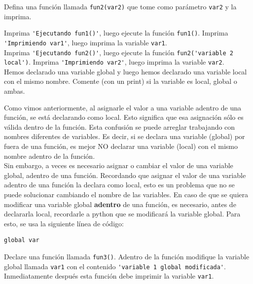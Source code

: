 \documentclass[11pt,letterpaper]{exam}
\begin{document}
\begin{questions}
Defina una funci\'on llamada \verb"fun2(var2)" que tome como par\'ametro \verb"var2" y la imprima.



Imprima \verb"'Ejecutando fun1()'", luego ejecute la funci\'on \verb"fun1()". Imprima \verb"'Imprimiendo var1'", luego imprima la variable \verb"var1". \\

Imprima \verb"'Ejecutando fun2()'", luego ejecute la funci\'on \verb"fun2('variable 2 local')". Imprima \verb"'Imprimiendo var2'", luego imprima la variable \verb"var2". \\

Hemos declarado una variable global y luego hemos declarado una variable local con el mismo nombre. Comente (con un print) si la variable es local, global o ambas.


Como vimos anteriormente, al asignarle el valor a una variable adentro de una funci\'on, se est\'a declarando como local. Esto significa que esa asignaci\'on s\'olo es v\'alida dentro de la funci\'on. Esta confusi\'on se puede arreglar trabajando con nombres diferentes de variables. Es decir, si se declara una variable (global) por fuera de una funci\'on, es mejor NO declarar una variable (local) con el mismo nombre adentro de la funci\'on.\\

Sin embargo, a veces es necesario asignar o cambiar el valor de una variable global, adentro de una funci\'on. Recordando que asignar el valor de una variable adentro de una funci\'on la declara como local, esto es un problema que no se puede solucionar cambiando el nombre de las variables. En caso de que se quiera modificar una variable global \textbf{adentro} de una funci\'on, es necesario, antes de declararla local, recordarle a python que se modificar\'a la variable global. Para esto, se usa la siguiente l\'inea de c\'odigo:

\begin{verbatim}
global var
\end{verbatim}

Declare una funci\'on llamada \verb"fun3()". Adentro de la funci\'on modifique la variable global llamada \verb"var1" con el contenido \verb"'variable 1 global modificada'". Inmediatamente despu\'es esta funci\'on debe imprimir la variable \verb"var1".\\  


\end{questions}
\end{document}

